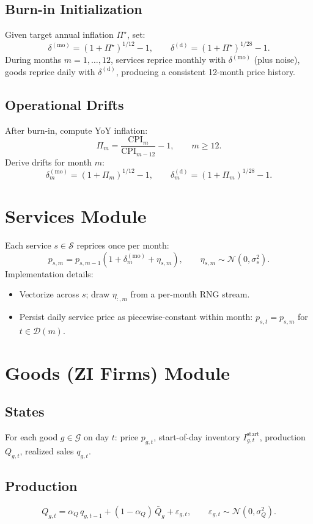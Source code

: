 \documentclass[12pt]{article}
\begin{document}
\subsection*{Burn-in Initialization}
Given target annual inflation $\Pi^\star$, set:
$$
\delta^{(\mathrm{mo})}=(1+\Pi^\star)^{1/12}-1,\qquad
\delta^{(\mathrm{d})}=(1+\Pi^\star)^{1/28}-1.
$$
During months $m=1,\dots,12$, services reprice monthly with $\delta^{(\mathrm{mo})}$ (plus noise), goods reprice daily with $\delta^{(\mathrm{d})}$, producing a consistent 12-month price history.

\subsection*{Operational Drifts}
After burn-in, compute YoY inflation:
$$
\Pi_m=\frac{\mathrm{CPI}_m}{\mathrm{CPI}_{m-12}}-1,\qquad m\ge 12.
$$
Derive drifts for month $m$:
$$
\delta_m^{(\mathrm{mo})}=(1+\Pi_m)^{1/12}-1,\qquad
\delta_m^{(\mathrm{d})}=(1+\Pi_m)^{1/28}-1.
$$

\section{Services Module}
Each service $s\in\mathcal{S}$ reprices once per month:
$$
p_{s,m}=p_{s,m-1}\left(1+\delta_m^{(\mathrm{mo})}+\eta_{s,m}\right),\qquad \eta_{s,m}\sim\mathcal{N}(0,\sigma_s^2).
$$
Implementation details:
\begin{itemize}
  \item Vectorize across $s$; draw $\eta_{:,m}$ from a per-month RNG stream.
  \item Persist daily service price as piecewise-constant within month: $p_{s,t}=p_{s,m}$ for $t\in\mathcal{D}(m)$.
\end{itemize}

\section{Goods (ZI Firms) Module}
\subsection*{States}
For each good $g\in\mathcal{G}$ on day $t$: price $p_{g,t}$, start-of-day inventory $I^{\mathrm{start}}_{g,t}$, production $Q_{g,t}$, realized sales $q_{g,t}$.

\subsection*{Production}
$$
Q_{g,t}=\alpha_Q\,q_{g,t-1}+(1-\alpha_Q)\,\bar{Q}_g+\varepsilon_{g,t},\qquad \varepsilon_{g,t}\sim\mathcal{N}(0,\sigma_Q^2).
$$
\end{document}
